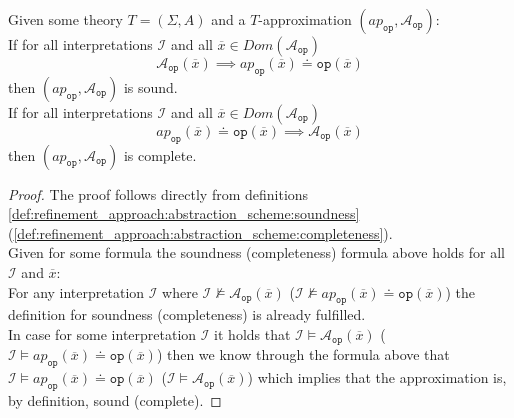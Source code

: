 \begin{lemma}
    \label{lemma:refinement_approach:abstraction_scheme:implication}
    Given some theory $T=\left(\Sigma,A\right)$ and a $T$-approximation $\left(ap_{\texttt{op}}, \mathcal{A}_{\texttt{op}}\right)$:\\
    If for all interpretations $\mathcal{I}$ and all $\overline{x}\in Dom\left(\mathcal{A}_{\texttt{op}}\right)$
    \[
        \mathcal{A}_{\texttt{op}}\left(\overline{x}\right) \implies ap_{\texttt{op}}\left(\overline{x}\right) \doteq \texttt{op}\left(\overline{x}\right)
    \]
    then $\left(ap_{\texttt{op}}, \mathcal{A}_{\texttt{op}}\right)$ is sound.\\
    If for all interpretations $\mathcal{I}$ and all $\overline{x}\in Dom\left(\mathcal{A}_{\texttt{op}}\right)$
    \[
        ap_{\texttt{op}}\left(\overline{x}\right) \doteq \texttt{op}\left(\overline{x}\right) \implies \mathcal{A}_{\texttt{op}}\left(\overline{x}\right)
    \]
    then $\left(ap_{\texttt{op}}, \mathcal{A}_{\texttt{op}}\right)$ is complete.
    \begin{proof}
        The proof follows directly from definitions \ref{def:refinement_approach:abstraction_scheme:soundness} (\ref{def:refinement_approach:abstraction_scheme:completeness}).\\
        Given for some formula the soundness (completeness) formula above holds for all $\mathcal{I}$ and $\overline{x}$:\\
        For any interpretation $\mathcal{I}$ where
            $\mathcal{I}\nvDash\mathcal{A}_{\texttt{op}}\left(\overline{x}\right)$
            ($\mathcal{I}\nvDash ap_{\texttt{op}}\left(\overline{x}\right) \doteq \texttt{op}\left(\overline{x}\right)$)
            the definition for soundness (completeness) is already fulfilled.\\
        In case for some interpretation $\mathcal{I}$ it holds that 
            $\mathcal{I}\vDash\mathcal{A}_{\texttt{op}}\left(\overline{x}\right)$
            ($\mathcal{I}\vDash ap_{\texttt{op}}\left(\overline{x}\right) \doteq \texttt{op}\left(\overline{x}\right)$)
        then we know through the formula above that
            $\mathcal{I}\vDash ap_{\texttt{op}}\left(\overline{x}\right) \doteq \texttt{op}\left(\overline{x}\right)$
            ($\mathcal{I}\vDash\mathcal{A}_{\texttt{op}}\left(\overline{x}\right)$)
        which implies that the approximation is, by definition, sound (complete).


    \end{proof}
\end{lemma}

